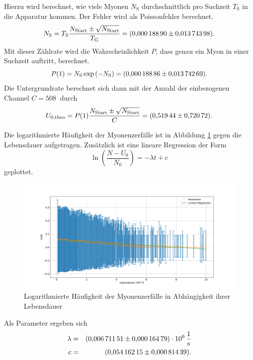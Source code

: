Hierzu wird berechnet, wie viele Myonen $N_{\text{S}}$ durchschnittlich pro Suchzeit $T_{\text{S}}$ in die Apparatur kommen.
Der Fehler wird als Poissonfehler berechnet.
\begin{equation*}
  N_{\text{S}} = T_{\text{S}}\frac{N_{\text{Start}} \pm \sqrt{ N_{\text{Start}}} }{T_{\text{G}}} = \SI{0.00018890 \pm 0.01374398}{}.
\end{equation*}
Mit dieser Zählrate wird die Wahrscheinlichkeit $P$, dass genau ein Myon in einer Suchzeit auftritt, berechnet.
\begin{equation*}
  P(1) = N_{\text{S}} \exp{(-N_{\text{S}})} = \SI{0.00018886 \pm 0.01374269}{}.
\end{equation*}
Die Untergrundrate berechnet sich dann mit der Anzahl der einbezogenen Channel $C=\SI{508}{}$ durch
\begin{equation*}
  U_{\text{0,theo}}= P(1) \frac{ N_{\text{Start}} \pm \sqrt{ N_{\text{Start}} }}{C} = \SI{0.51944 \pm 0.72072}{}.
\end{equation*}






Die logarithmierte Häufigkeit der Myonenzerfälle ist in Abbildung \ref{fig:lnmyonen} gegen die Lebensdauer aufgetragen.
Zusätzlich ist eine lineare Regression der Form
\begin{equation*}
\ln{ \left( \frac{N-U_{0}}{N_{0}} \right)}= -\lambda t +c
\end{equation*}
geplottet.
\begin{figure}[h!]
  \centering
  \includegraphics[width=\textwidth]{figlnmyonen.pdf}
  \caption{Logarithmierte Häufigkeit der Myonenzerfälle in Abhängigkeit ihrer Lebensdauer}
  \label{fig:lnmyonen}
\end{figure}
Als Parameter ergeben sich
\begin{align*}
 \lambda  &=& \SI{0.00671151 \pm 0.00016479 e06}{\frac{1}{s}}\\
 c        &=& \SI{0.05416215 \pm 0.00081439}{}.\\
\end{align*}
\FloatBarrier
